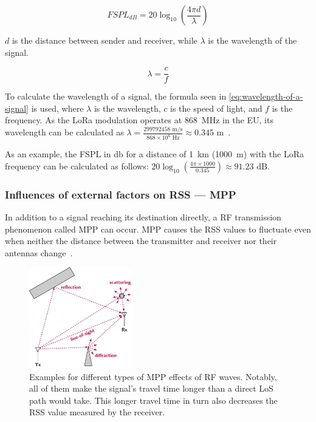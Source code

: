 \begin{equation}\label{eq:fspl}
    FSPL_{dB} = 20 \log_{10}\left(\frac{4 \pi d}{\lambda}\right)
\end{equation}

$d$ is the distance between sender and receiver, while $\lambda$ is the wavelength of the signal.

\begin{equation}\label{eq:wavelength-of-a-signal}
    \lambda = \frac{c}{f}
\end{equation}

To calculate the wavelength of a signal, the formula seen in \cref{eq:wavelength-of-a-signal} is used, where $\lambda$ is the wavelength, $c$ is the speed of light, and $f$ is the frequency.
As the \ac{LoRa} modulation operates at \SI{868}{\mega\hertz} in the \ac{EU}, its wavelength can be calculated as $\lambda = \frac{299792458 \text{ m/s}}{868 \times 10^6 \text{ Hz}} \approx 0.345 \text{ m}$~\cite{lora_alliance_inc_lorawan_regional_2017}.

As an example, the \acl{FSPL} in \si{\decibel} for a distance of \SI{1}{\kilo\metre} (\SI{1000}{\metre}) with the \ac{LoRa} frequency can be calculated as follows: $20 \log_{10}\left(\frac{4 \pi \times 1000}{0.345}\right) \approx 91.23 \text{ dB}$.

\subsubsection{Influences of external factors on \acs{RSS} — \acl{MPP}}\label{sec:multipath-propagation}

In addition to a signal reaching its destination directly, a \ac{RF} transmission phenomenon called \acf{MPP} can occur.
\acl{MPP} causes the \ac{RSS} values to fluctuate even when neither the distance between the transmitter and receiver nor their antennas change~\cite[p. 136]{abdelfadeel_how_2019}.

\begin{figure}[htbp]
    \centering
    \includegraphics[width=0.4\textwidth]{pictures/diagrams_figures/multipath_propagation.jpg}
    \caption{
        Examples for different types of \acf{MPP} effects of \ac{RF} waves.
        Notably, all of them make the signal's travel time longer than a direct \ac{LoS} path would take.
        This longer travel time in turn also decreases the \ac{RSS} value measured by the receiver.~\protect\cite{milosevic_key_2017}
    }\label{pic:figure_multipath_propagation}
\end{figure}

